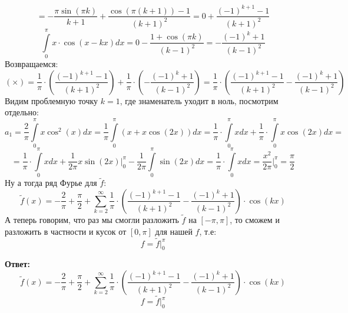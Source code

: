 \documentclass[a4paper,12pt]{article}
\begin{document}
\[
= -\frac{\pi \sin (\pi k)}{k + 1} + \frac{\cos (\pi (k + 1)) -1}{(k+1)^2} = 0 + \frac{(-1)^{k+1} - 1}{(k+1)^2}
\]
\[
 \int\limits_0^{\pi} x \cdot \cos (x - kx) dx  = 0 - \frac{1 + \cos (\pi k)}{(k-1)^2} = - \frac{(-1)^{k} + 1}{(k-1)^2}
\]
Возвращаемся:
\[
(\times) = \frac{1}{\pi} \cdot \left(\frac{(-1)^{k+1} - 1}{(k+1)^2}\right) + \frac{1}{\pi} \cdot \left( - \frac{(-1)^{k} + 1}{(k-1)^2}\right) = \frac{1}{\pi} \cdot \left(\frac{(-1)^{k+1} - 1}{(k+1)^2}  - \frac{(-1)^{k} + 1}{(k-1)^2}
\right)
\]
Видим проблемную точку $k = 1$, где знаменатель уходит в ноль, посмотрим отдельно:
\[
a_1 = \frac{2}{\pi} \int\limits_{0}^{\pi}  x \cos^2 (x)  dx = \frac{1}{\pi} \int\limits_0^{\pi}( x + x \cos (2x) ) dx = \frac{1}{\pi} \cdot \int\limits_0^{\pi} x dx + \frac{1}{\pi} \cdot \int\limits_0^{\pi} x \cos (2x) dx = 
\]
\[
=  \frac{1}{\pi} \cdot \int\limits_0^{\pi} x dx + \frac{1}{2\pi} x \sin (2x) \Bigg|_0^{\pi} - \frac{1}{2\pi} \int\limits_0^{\pi} \sin (2x) dx =  \frac{1}{\pi} \cdot \int\limits_0^{\pi} x dx = \frac{x^2}{2\pi} \Bigg|_0^{\pi} = \frac{\pi}{2}
\] 
Ну а тогда ряд Фурье для $\tilde{f}$:
\[
\tilde{f} (x) = 
-\frac{2}{\pi} + \frac{\pi}{2} + \sum_{k = 2}^{\infty}\frac{1}{\pi} \cdot \left(\frac{(-1)^{k+1} - 1}{(k+1)^2}  - \frac{(-1)^{k} + 1}{(k-1)^2}
\right) \cdot \cos (kx)
\]
А теперь говорим, что раз мы смогли разложить $\tilde{f}$ на $[-\pi, \pi]$, то сможем и разложить в частности и кусок от $[0, \pi]$ для нашей $f$, т.е:
\[
f = \tilde{f} \Bigg|_0^{\pi}
\]
\begin{center}
\textbf{Ответ: } 
\[\tilde{f} (x) = 
-\frac{2}{\pi} +  \frac{\pi}{2} +  \sum_{k = 2}^{\infty}\frac{1}{\pi} \cdot \left(\frac{(-1)^{k+1} - 1}{(k+1)^2}  - \frac{(-1)^{k} + 1}{(k-1)^2}
\right) \cdot \cos (kx)
\]
\[
f = \tilde{f} \Bigg|_0^{\pi}
\]
\end{center}
\clearpage
\end{document}
